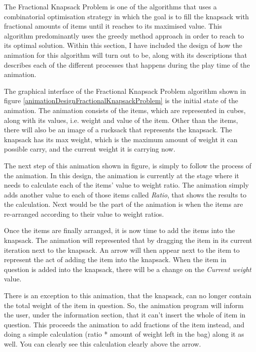 The Fractional Knapsack Problem is one of the algorithms that uses a combinatorial optimisation strategy in which the goal is to fill the knapsack with fractional amounts of items until it reaches to its maximised value. This algorithm predominantly uses the greedy method approach in order to reach to its optimal solution. Within this section, I have included the design of how the animation for this algorithm will turn out to be, along with its descriptions that describes each of the different processes that happens during the play time of the animation.

The graphical interface of the Fractional Knapsack Problem algorithm shown in figure \ref{animationDesignFractionalKnapsackProblem} is the initial state of the animation. The animation consists of the items, which are represented in cubes, along with its values, i.e. weight and value of the item. Other than the items, there will also be an image of a rucksack that represents the knapsack. The knapsack has its max weight, which is the maximum amount of weight it can possible carry, and the current weight it is carrying now.

The next step of this animation shown in figure, is simply to follow the process of the animation. In this design, the animation is currently at the stage where it needs to calculate each of the items' value to weight ratio. The animation simply adds another value to each of those items called \textit{Ratio}, that shows the results to the calculation. Next would be the part of the animation is when the items are re-arranged according to their value to weight ratios.

Once the items are finally arranged, it is now time to add the items into the knapsack. The animation will represented that by dragging the item in its current iteration next to the knapsack. An arrow will then appear next to the item to represent the act of adding the item into the knapsack. When the item in question is added into the knapsack, there will be a change on the \textit{Current weight} value. 

There is an exception to this animation, that the knapsack, can no longer contain the total weight of the item in question. So, the animation program will inform the user, under the information section, that it can't insert the whole of item in question. This proceeds the animation to add fractions of the item instead, and doing a simple calculation (ratio * amount of weight left in the bag) along it as well. You can clearly see this calculation clearly above the arrow.

